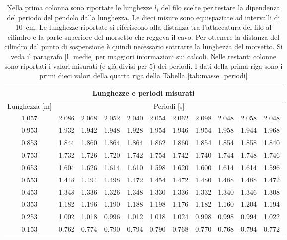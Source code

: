 \begin{table}[b!]
    \centering
    \begin{tabular}{c c c c c c c c c c c}
        \multicolumn{11}{c}{\textbf{Lunghezze e periodi misurati}} \\
        \toprule
        Lunghezza [m] & \multicolumn{10}{c}{Periodi [s]} \\
        \midrule
        1.057 & 2.086 & 2.068 & 2.052 & 2.040 & 2.054 & 2.062 & 2.098 & 2.048 & 2.058 & 2.048 \\
        0.953 & 1.932 & 1.942 & 1.948 & 1.928 & 1.954 & 1.946 & 1.954 & 1.958 & 1.944 & 1.968 \\
        0.853 & 1.844 & 1.860 & 1.864 & 1.864 & 1.862 & 1.860 & 1.854 & 1.854 & 1.858 & 1.840 \\
        0.753 & 1.732 & 1.726 & 1.720 & 1.742 & 1.754 & 1.742 & 1.740 & 1.744 & 1.748 & 1.746 \\
        0.653 & 1.604 & 1.626 & 1.614 & 1.610 & 1.598 & 1.620 & 1.600 & 1.614 & 1.614 & 1.596 \\
        0.553 & 1.448 & 1.494 & 1.498 & 1.472 & 1.454 & 1.472 & 1.480 & 1.488 & 1.488 & 1.472 \\
        0.453 & 1.348 & 1.336 & 1.326 & 1.348 & 1.330 & 1.336 & 1.332 & 1.340 & 1.346 & 1.308 \\
        0.353 & 1.182 & 1.196 & 1.190 & 1.188 & 1.198 & 1.176 & 1.182 & 1.160 & 1.204 & 1.194 \\
        0.253 & 1.002 & 1.018 & 0.996 & 1.012 & 1.018 & 1.024 & 0.998 & 0.998 & 0.994 & 1.022 \\
        0.153 & 0.762 & 0.774 & 0.790 & 0.794 & 0.790 & 0.768 & 0.770 & 0.768 & 0.794 & 0.772 \\
        \bottomrule
    \end{tabular}
    \caption{Nella prima colonna sono riportate le lunghezze $\bar{l}_i$ del filo scelte per testare la dipendenza del periodo
        del pendolo dalla lunghezza. Le dieci misure sono equispaziate ad intervalli di \SI{10}{\centi\metre}.
        Le lunghezze riportate si riferiscono alla distanza tra l'attaccatura del filo al cilindro e la parte superiore
        del morsetto che reggeva il cavo. Per ottenere la distanza del cilindro dal punto di sospensione è quindi
        necessario sottrarre la lunghezza del morsetto. Si veda il paragrafo \ref{l_medie} per maggiori informazioni sui calcoli.
        Nelle restanti colonne sono riportati i valori misurati (e già divisi per 5) dei periodi. I dati della prima riga sono i primi
        dieci valori della quarta riga della Tabella \ref{tab:masse_periodi}}
    \label{tab:lunghezze_periodi}
\end{table}
